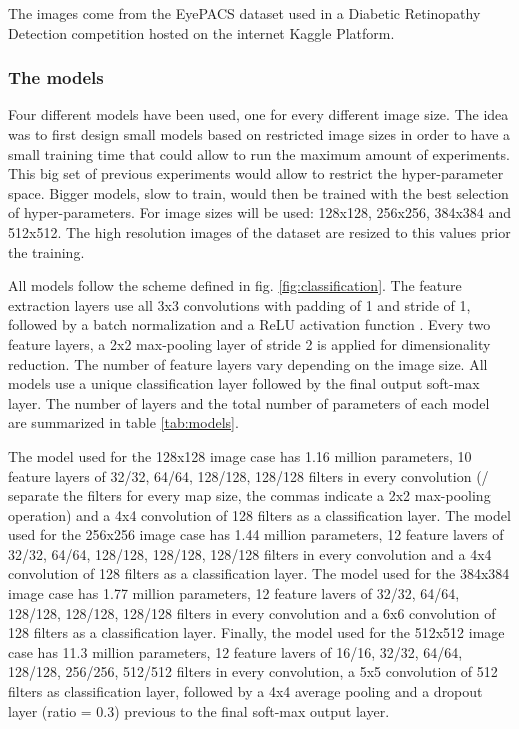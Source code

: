 \documentclass[times,twocolumn,final,authoryear]{elsarticle}
\begin{document}
The images come from the EyePACS dataset used in a Diabetic Retinopathy Detection competition hosted on the internet Kaggle Platform.

\subsubsection{The models}

Four different models have been used, one for every different image size. The idea was to first design small models based on restricted image sizes in order to have a small training time that could allow to run the maximum amount of experiments. This big set of previous experiments would allow to restrict the hyper-parameter space. Bigger models, slow to train, would then be trained with the best selection of hyper-parameters. For image sizes will be used: 128x128, 256x256, 384x384 and 512x512. The high resolution images of the dataset are resized to this values prior the training.

All models follow the scheme defined in fig. \ref{fig:classification}. The feature extraction layers use all 3x3 convolutions with padding of 1 and stride of 1, followed by a batch normalization\citep{batch-norm} and a ReLU activation function \citep{Dahl2013}. Every two feature layers, a 2x2 max-pooling layer of stride 2 is applied for dimensionality reduction. The number of feature layers vary depending on the image size. All models use a unique classification layer followed by the final output soft-max layer. The number of layers and the total number of parameters of each model are summarized in table \ref{tab:models}.

The model used for the 128x128 image case has 1.16 million parameters, 10 feature layers of 32/32, 64/64, 128/128, 128/128 filters in every convolution (/ separate the filters for every map size, the commas indicate a 2x2 max-pooling operation) and a 4x4 convolution of 128 filters as a classification layer. The model used for the 256x256 image case has 1.44 million parameters, 12 feature lavers of 32/32, 64/64, 128/128, 128/128, 128/128 filters in every convolution and a 4x4 convolution of 128 filters as a classification layer. The model used for the 384x384 image case has 1.77 million parameters, 12 feature lavers of 32/32, 64/64, 128/128, 128/128, 128/128 filters in every convolution and a 6x6 convolution of 128 filters as a classification layer. Finally, the model used for the 512x512 image case has 11.3 million parameters, 12 feature lavers of 16/16, 32/32, 64/64, 128/128, 256/256, 512/512 filters in every convolution, a 5x5 convolution of 512 filters as classification layer, followed by a 4x4 average pooling and a dropout layer (ratio = 0.3) previous to the final soft-max output layer.
\end{document}
